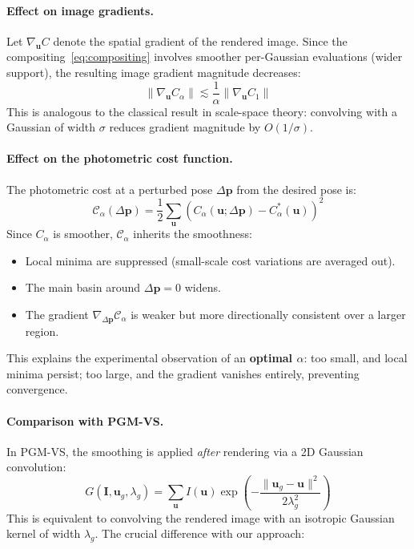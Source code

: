 \documentclass[11pt]{article}
\begin{document}
\paragraph{Effect on image gradients.}
Let $\nabla_{\mathbf{u}} C$ denote the spatial gradient of the rendered image. Since the compositing~\eqref{eq:compositing} involves smoother per-Gaussian evaluations (wider support), the resulting image gradient magnitude decreases:
\begin{equation}
    \| \nabla_{\mathbf{u}} C_\alpha \| \lesssim \frac{1}{\alpha} \| \nabla_{\mathbf{u}} C_1 \|
\end{equation}
This is analogous to the classical result in scale-space theory: convolving with a Gaussian of width $\sigma$ reduces gradient magnitude by $O(1/\sigma)$.

\paragraph{Effect on the photometric cost function.}
The photometric cost at a perturbed pose $\Delta\mathbf{p}$ from the desired pose is:
\begin{equation}
    \mathcal{C}_\alpha(\Delta\mathbf{p}) = \frac{1}{2} \sum_{\mathbf{u}} \left( C_\alpha(\mathbf{u}; \Delta\mathbf{p}) - C_\alpha^*(\mathbf{u}) \right)^2
\end{equation}
Since $C_\alpha$ is smoother, $\mathcal{C}_\alpha$ inherits the smoothness:
\begin{itemize}
    \item Local minima are suppressed (small-scale cost variations are averaged out).
    \item The main basin around $\Delta\mathbf{p} = 0$ widens.
    \item The gradient $\nabla_{\Delta\mathbf{p}} \mathcal{C}_\alpha$ is weaker but more directionally consistent over a larger region.
\end{itemize}
This explains the experimental observation of an \textbf{optimal $\alpha$}: too small, and local minima persist; too large, and the gradient vanishes entirely, preventing convergence.

\paragraph{Comparison with PGM-VS.}
In PGM-VS, the smoothing is applied \emph{after} rendering via a 2D Gaussian convolution:
\begin{equation}
    G(\mathbf{I}, \mathbf{u}_g, \lambda_g) = \sum_{\mathbf{u}} I(\mathbf{u}) \exp\!\left(-\frac{\|\mathbf{u}_g - \mathbf{u}\|^2}{2\lambda_g^2}\right)
\end{equation}
This is equivalent to convolving the rendered image with an isotropic Gaussian kernel of width $\lambda_g$. The crucial difference with our approach:
\end{document}
